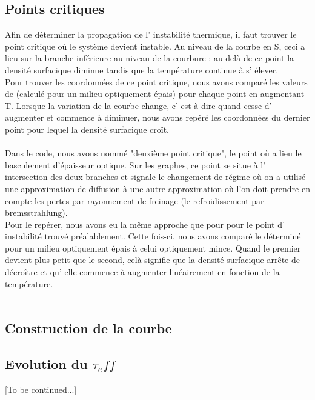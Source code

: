 \subsection{Points critiques}
Afin de déterminer la propagation de l' instabilité thermique, il faut trouver le point critique où le système devient instable. Au niveau de la courbe en S, ceci a lieu sur la branche inférieure au niveau de la courbure : au-delà de ce point la densité surfacique diminue tandis que la température continue à s' élever.
\\
Pour trouver les coordonnées de ce point critique, nous avons comparé les valeurs de \Sigma (calculé pour un milieu optiquement épais) pour chaque point en augmentant T. Lorsque la variation de la courbe change, c' est-à-dire quand \Sigma cesse d' augmenter et commence à diminuer, nous avons repéré les coordonnées du dernier point pour lequel la densité surfacique croît.
\\
[?discussion sur les autres manières envisagées ?]        
\\
Dans le code, nous avons nommé "deuxième point critique", le point où a lieu le basculement d'épaisseur optique. Sur les graphes, ce point se situe à l' intersection des deux branches et signale le changement de régime où on a utilisé une approximation de diffusion à une autre approximation où l'on doit prendre en compte les pertes par rayonnement de freinage (le refroidissement par bremsstrahlung).
\\
 Pour le repérer, nous avons eu la même approche que pour pour le point d' instabilité trouvé préalablement. Cette fois-ci, nous avons comparé le \Sigma déterminé pour un milieu optiquement épais à celui optiquement mince. Quand le premier devient plus petit que le second, celà signifie que la densité surfacique arrête de décroître et qu' elle commence à augmenter linéairement en fonction de la température. 
\\
[?si on mentionne la façon avec les dérivées : ce point là est un point anguleux!]
\\
[courbe en S avec les points légendés + ?evolution en fonction de r ?]

\subsection{Construction de la courbe}

\subsection{Evolution du $\tau_eff$}
[To be continued...]

\\
[DISCUSSION BLABLA]